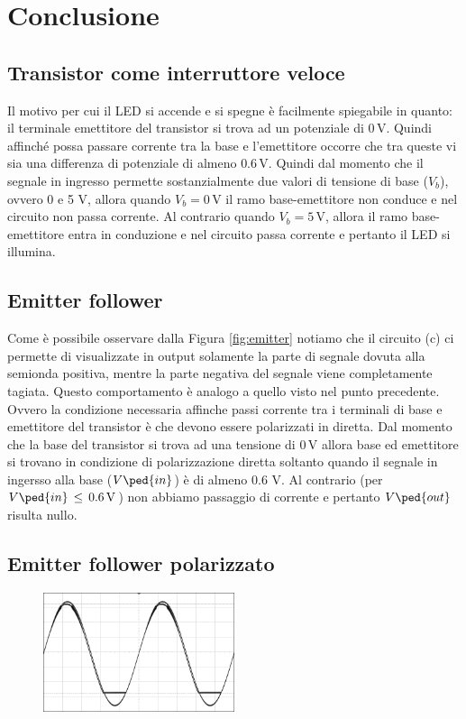 \section*{Conclusione}

\subsection*{Transistor come interruttore veloce}

Il motivo per cui il LED si accende e si spegne è facilmente spiegabile in quanto: il terminale emettitore del transistor si trova ad un potenziale di $0\,\si{\volt}$. Quindi affinché possa passare corrente tra la base e l'emettitore occorre che tra queste vi sia una differenza di potenziale di almeno $0.6\,\si{\volt}$. Quindi dal momento che il segnale in ingresso permette sostanzialmente due valori di tensione di base ($V_b$), ovvero 0 e 5 $\si{\volt}$, allora quando $V_b=0\,\si{\volt}$ il ramo base-emettitore non conduce e nel circuito non passa corrente. Al contrario quando $V_b=5\,\si{\volt}$, allora il ramo base-emettitore entra in conduzione e nel circuito passa corrente e pertanto il LED si illumina.

\subsection*{Emitter follower}

Come è possibile osservare dalla Figura \ref{fig:emitter} notiamo che il circuito (c) ci permette di visualizzate in output solamente la parte di segnale dovuta alla semionda positiva, mentre la parte negativa del segnale viene completamente tagiata. Questo comportamento è analogo a quello visto nel punto precedente. Ovvero la condizione necessaria affinche passi corrente tra i terminali di base e emettitore del transistor è che devono essere polarizzati in diretta. Dal momento che la base del transistor si trova ad una tensione di $0\,\si{\volt}$ allora base ed emettitore si trovano in condizione di polarizzazione diretta soltanto quando il segnale in ingersso alla base ($V\ped{in}$) è di almeno 0.6 V. Al contrario (per $V\ped{in}\,\leq\,0.6\,\si{\volt}$) non abbiamo passaggio di corrente e pertanto $V\ped{out}$ risulta nullo.

\subsection*{Emitter follower polarizzato}

\begin{figure}
    \vspace{-10mm}
    \includegraphics[width=0.5\textwidth]{clip.png}
    \vspace{-10mm}
\end{figure}

